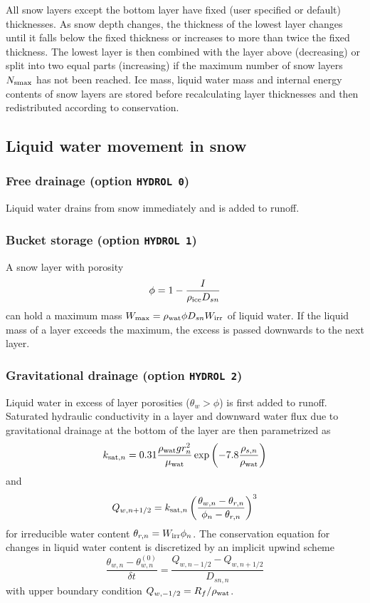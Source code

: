 \documentclass[fleqn]{article}
\begin{document}
All snow layers except the bottom layer have fixed (user specified or default) thicknesses. As snow depth changes, the thickness of the lowest layer changes until it falls below the fixed thickness or increases to more than twice the fixed thickness. The lowest layer is then combined with the layer above (decreasing) or split into two equal parts (increasing) if the maximum number of snow layers $N_{\rm smax}$ has not been reached. Ice mass, liquid water mass and internal energy contents of snow layers are stored before recalculating layer thicknesses and then redistributed according to conservation.

\subsection{Liquid water movement in snow}

\subsubsection{Free drainage (option {\tt HYDROL 0})}
Liquid water drains from snow immediately and is added to runoff.

\subsubsection{Bucket storage (option {\tt HYDROL 1})}
A snow layer with porosity
\begin{equation}
\phi = 1 - \frac{I}{\rho_{\rm ice}D_{sn}}
\end{equation}
can hold a maximum mass $W_{\rm max}=\rho_{\rm wat}\phi D_{sn} W_{\rm irr}$ of liquid water. If the liquid mass of a layer exceeds the maximum, the excess is passed downwards to the next layer.

\subsubsection{Gravitational drainage (option {\tt HYDROL 2})}
Liquid water in excess of layer porosities ($\theta_w>\phi$) is first added to runoff. Saturated hydraulic conductivity in a layer and downward water flux due to gravitational drainage at the bottom of the layer are then parametrized as
\begin{equation}
k_{{\rm sat},n} = 0.31\frac{\rho_{\rm wat}gr_n^2}{\mu_{\rm wat}}\exp\left(-7.8\frac{\rho_{s,n}}{\rho_{\rm wat}}\right)
\end{equation}
and
\begin{equation}
Q_{w,n+1/2} = k_{{\rm sat},n}\left(\frac{\theta_{w,n} - \theta_{r,n}}{\phi_n - \theta_{r,n}}\right)^3
\end{equation}
for irreducible water content $\theta_{r,n} = W_{\rm irr}\phi_n$. The conservation equation for changes in liquid water content is discretized by an implicit upwind scheme
\begin{equation}
\frac{\theta_{w,n} - \theta_{w,n}^{(0)}}{\delta t} = \frac{Q_{w,n-1/2} - Q_{w,n+1/2}}{D_{sn,n}}
\label{eq:water}
\end{equation}
with upper boundary condition $Q_{w,-1/2} = R_f/\rho_{\rm wat}$.
\end{document}
